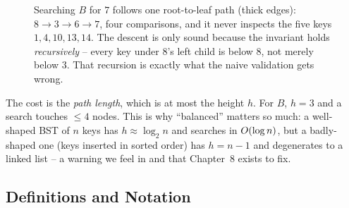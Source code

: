 \begin{figure}[H]
\centering
{}
\caption{Searching $B$ for $7$ follows one root-to-leaf path (thick edges): $8\to3\to6\to7$, four
comparisons, and it never inspects the five keys $1,4,10,13,14$. The descent is only sound because
the invariant holds \emph{recursively} -- every key under $8$'s left child is below $8$, not merely
below $3$. That recursion is exactly what the naive validation gets wrong.}\label{fig:c05-search}
\end{figure}

The cost is the \emph{path length}, which is at most the height $h$. For $B$, $h=3$ and a search
touches $\le 4$ nodes. This is why ``balanced'' matters so much: a well-shaped BST of $n$ keys has
$h\approx\log_2 n$ and searches in $O(\log n)$, but a badly-shaped one (keys inserted in sorted
order) has $h=n-1$ and degenerates to a linked list -- a warning we feel in 
and that Chapter~8 exists to fix.

\subsection{Definitions and Notation}

